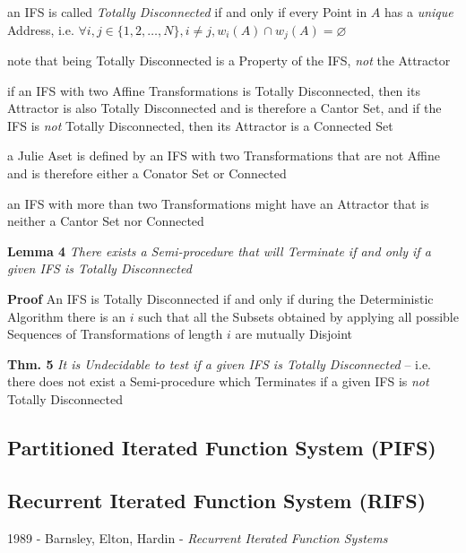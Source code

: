 an IFS is called \emph{Totally Disconnected} if and only if every Point in $A$
has a \emph{unique} Address, i.e.
$\forall i, j \in \{1, 2, \ldots, N\}, i \neq j, w_i(A) \cap w_j(A) = \varnothing$

note that being Totally Disconnected is a Property of the IFS, \emph{not} the
Attractor

if an IFS with two Affine Transformations is Totally Disconnected, then its
Attractor is also Totally Disconnected and is therefore a Cantor Set, and if the
IFS is \emph{not} Totally Disconnected, then its Attractor is a Connected Set

a Julie Aset is defined by an IFS with two Transformations that are not Affine
and is therefore either a Conator Set or Connected

an IFS with more than two Transformations might have an Attractor that is
neither a Cantor Set nor Connected

\textbf{Lemma 4} \emph{There exists a Semi-procedure that will Terminate if and
  only if a given IFS is Totally Disconnected}

\textbf{Proof} An IFS is Totally Disconnected if and only if during the
Deterministic Algorithm there is an $i$ such that all the Subsets obtained by
applying all possible Sequences of Transformations of length $i$ are mutually
Disjoint

\textbf{Thm. 5} \emph{It is Undecidable to test if a given IFS is Totally
  Disconnected}
-- i.e. there does not exist a Semi-procedure which Terminates if a given IFS is
\emph{not} Totally Disconnected



\subsection{Partitioned Iterated Function System (PIFS)}\label{sec:pifs}

\subsection{Recurrent Iterated Function System (RIFS)}\label{sec:rifs}

1989 - Barnsley, Elton, Hardin - \emph{Recurrent Iterated Function Systems}



